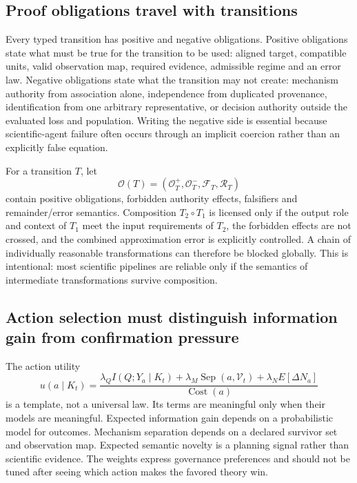 \subsection{Proof obligations travel with transitions}

Every typed transition has positive and negative obligations. Positive obligations state what must be true for the transition to be used: aligned target, compatible units, valid observation map, required evidence, admissible regime and an error law. Negative obligations state what the transition may not create: mechanism authority from association alone, independence from duplicated provenance, identification from one arbitrary representative, or decision authority outside the evaluated loss and population. Writing the negative side is essential because scientific-agent failure often occurs through an implicit coercion rather than an explicitly false equation.

For a transition \(T\), let
\[
\mathcal O(T)=
(\mathcal O_T^+,\mathcal O_T^-,\mathcal F_T,\mathcal R_T)
\]
contain positive obligations, forbidden authority effects, falsifiers and remainder/error semantics. Composition \(T_2\circ T_1\) is licensed only if the output role and context of \(T_1\) meet the input requirements of \(T_2\), the forbidden effects are not crossed, and the combined approximation error is explicitly controlled. A chain of individually reasonable transformations can therefore be blocked globally. This is intentional: most scientific pipelines are reliable only if the semantics of intermediate transformations survive composition.

\subsection{Action selection must distinguish information gain from confirmation pressure}

The action utility
\[
u(a\mid K_t)=
\frac{\lambda_Q I(Q;Y_a\mid K_t)+
\lambda_M\operatorname{Sep}(a,\mathcal V_t)+
\lambda_N E[\Delta N_a]}{\operatorname{Cost}(a)}
\]
is a template, not a universal law. Its terms are meaningful only when their models are meaningful. Expected information gain depends on a probabilistic model for outcomes. Mechanism separation depends on a declared survivor set and observation map. Expected semantic novelty is a planning signal rather than scientific evidence. The weights express governance preferences and should not be tuned after seeing which action makes the favored theory win.

